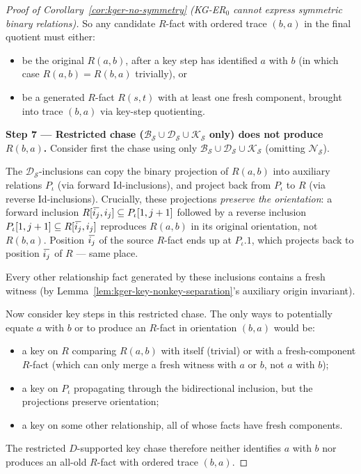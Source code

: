\documentclass[10pt]{article}
\newcommand{\ols}[1]{\mskip.5\thinmuskip\overline{\mskip-.5\thinmuskip {#1} \mskip-.5\thinmuskip}\mskip.5\thinmuskip} %
\begin{document}
\begin{proof}[Proof of Corollary~\ref{cor:kger-no-symmetry} (KG-ER$_0$ cannot express symmetric binary relations)]
So any candidate \(R\)-fact with ordered trace \((b,a)\) in the final
quotient must either:
\begin{itemize}
\item be the original \(R(a,b)\), after a key step has identified
\(a\) with \(b\) (in which case \(R(a,b)=R(b,a)\) trivially), or
\item be a generated \(R\)-fact \(R(s,t)\) with at least one fresh
component, brought into trace \((b,a)\) via key-step quotienting.
\end{itemize}

\smallskip\noindent\textbf{Step 7 --- Restricted chase
(\(\mathcal B_{\mathcal S}\cup\mathcal D_{\mathcal S}\cup
\mathcal K_{\mathcal S}\) only) does not produce \(R(b,a)\).}
Consider first the chase using only
\(\mathcal B_{\mathcal S}\cup\mathcal D_{\mathcal S}\cup
\mathcal K_{\mathcal S}\) (omitting \(\mathcal N_{\mathcal S}\)).

The \(\mathcal D_{\mathcal S}\)-inclusions can copy the binary
projection of \(R(a,b)\) into auxiliary relations \(P_\iota\) (via
forward Id-inclusions), and project back from \(P_\iota\) to \(R\)
(via reverse Id-inclusions).  Crucially, these projections
\emph{preserve the orientation}: a forward inclusion
\(R[\ols{i_j},i_j]\subseteq P_\iota[1,j+1]\) followed by a reverse
inclusion \(P_\iota[1,j+1]\subseteq R[\ols{i_j},i_j]\) reproduces
\(R(a,b)\) in its original orientation, not \(R(b,a)\).  Position
\(\ols{i_j}\) of the source \(R\)-fact ends up at \(P_\iota.1\), which
projects back to position \(\ols{i_j}\) of \(R\) --- same place.

Every other relationship fact generated by these inclusions contains
a fresh witness (by Lemma~\ref{lem:kger-key-nonkey-separation}'s
auxiliary origin invariant).

Now consider key steps in this restricted chase.  The only ways to
potentially equate \(a\) with \(b\) or to produce an \(R\)-fact in
orientation \((b,a)\) would be:
\begin{itemize}
\item a key on \(R\) comparing \(R(a,b)\) with itself (trivial) or
with a fresh-component \(R\)-fact (which can only merge a fresh
witness with \(a\) or \(b\), not \(a\) with \(b\));
\item a key on \(P_\iota\) propagating through the bidirectional
inclusion, but the projections preserve orientation;
\item a key on some other relationship, all of whose facts have fresh
components.
\end{itemize}
The restricted \(D\)-supported key chase therefore neither identifies
\(a\) with \(b\) nor produces an all-old \(R\)-fact with ordered
trace \((b,a)\).


\end{proof}
\end{document}
